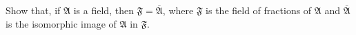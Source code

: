 Show that, if $\mathfrak{A}$ is a field, then $\mathfrak{F} = \overline{\mathfrak{A}}$, where $\mathfrak{F}$ is the field of fractions of $\mathfrak{A}$ and $\overline{\mathfrak{A}}$ is the isomorphic image of $\mathfrak{A}$ in $\mathfrak{F}$.
